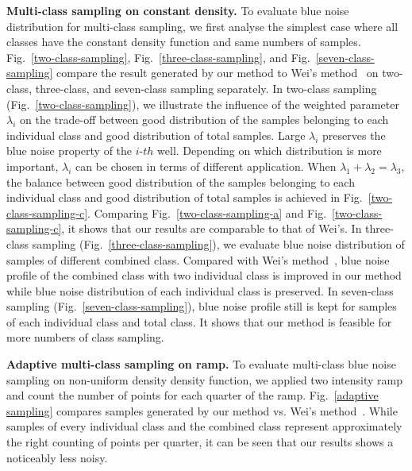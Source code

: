 \textbf{Multi-class sampling on constant density.}
To evaluate blue noise distribution for multi-class sampling,
we first analyse the simplest case where all classes have the constant density function and same numbers of samples.
Fig.~\ref{two-class-sampling}, Fig.~\ref{three-class-sampling},
and Fig.~\ref{seven-class-sampling} compare the result generated by our method to Wei's method~\cite{wei:2010:multi} on two-class, three-class, and seven-class sampling separately.
In two-class sampling (Fig.~\ref{two-class-sampling}),
we illustrate the influence of the weighted parameter $\lambda_i$ on the trade-off between good distribution of the samples belonging to each individual class and good distribution of total samples.
Large $\lambda_i$ preserves the blue noise property of the $i$-$th$ well.
Depending on which distribution is more important,
$\lambda_i$ can be chosen in terms of different application.
When $\lambda_1+\lambda_2=\lambda_3$,
the balance between good distribution of the samples belonging to each individual class and good distribution of total samples
is achieved in Fig.~\ref{two-class-sampling-c}.
Comparing Fig.~\ref{two-class-sampling-a} and Fig.~\ref{two-class-sampling-c},
it shows that our results are comparable to that of Wei's.
In three-class sampling (Fig.~\ref{three-class-sampling}),
we evaluate blue noise distribution of samples of different combined class.
Compared with Wei's method~\cite{wei:2010:multi},
 blue noise profile of the combined class with two individual class is improved in our method
while blue noise distribution of each individual class is preserved.
In seven-class sampling (Fig.~\ref{seven-class-sampling}),
blue noise profile still is kept for samples of each individual class and total class.
It shows that our method is feasible for more numbers of class sampling.


\textbf{Adaptive multi-class sampling on ramp.}
To evaluate multi-class blue noise sampling on non-uniform density density function,
we applied two intensity ramp and count the number of points for each quarter of the ramp.
Fig.~\ref{adaptive sampling} compares samples generated by
our method vs. Wei's method~\cite{wei:2010:multi}.
While samples of every individual class and the combined class represent approximately the right counting of points per quarter,
it can be seen that our results shows a noticeably less noisy.

